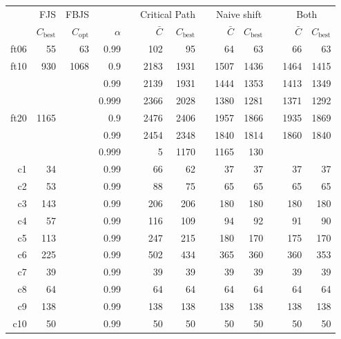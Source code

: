 \documentclass[a4paper,10pt]{article}
\begin{document}
\begin{table}[h]
\centering
\small
\begin{tabular}{@{\bfseries}rrrrrrrrrrrrr}
	\toprule
	& FJS & FBJS & && \multicolumn{2}{c}{Critical Path} &&
	\multicolumn{2}{c}{Naive shift} && \multicolumn{2}{c}{Both} \\
	\cmidrule(lr){2-2} \cmidrule(lr){3-3} \cmidrule(lr){6-7}
	\cmidrule(lr){9-10} \cmidrule(lr){12-13}
	\normalfont{name} & $C_\text{best}$ & $C_\text{opt}$ & $\alpha$ && $\bar{C}$ & $C_\text{best}$ &&
	$\bar{C}$ & $C_\text{best}$ && $\bar{C}$ & $C_\text{best}$ \\
	\midrule
	ft06 &   55 &   63 &  0.99 &&  102 &   95 &&   64 &   63 &&   66 &   63 \\
	ft10 &  930 & 1068 &   0.9 && 2183 & 1931 && 1507 & 1436 && 1464 & 1415 \\
	     &      &      &  0.99 && 2139 & 1931 && 1444 & 1353 && 1413 & 1349 \\
	     &      &      & 0.999 && 2366 & 2028 && 1380 & 1281 && 1371 & 1292 \\
	ft20 & 1165 &      &   0.9 && 2476 & 2406 && 1957 & 1866 && 1935 & 1869 \\
	     &      &      &  0.99 && 2454 & 2348 && 1840 & 1814 && 1860 & 1840 \\
	     &      &      & 0.999 && 5 & 1170 && 1165 &  130 &&   & \\[2ex]
	c1   &   34 &      &  0.99 &&   66 &   62 &&   37 &   37 &&   37 &   37 \\
	c2   &   53 &      &  0.99 &&   88 &   75 &&   65 &   65 &&   65 &   65 \\
	c3   &  143 &      &  0.99 &&  206 &  206 &&  180 &  180 &&  180 &  180 \\
	c4   &   57 &      &  0.99 &&  116 &  109 &&   94 &   92 &&   91 &   90 \\
	c5   &  113 &      &  0.99 &&  247 &  215 &&  180 &  170 &&  175 &  170 \\
	c6   &  225 &      &  0.99 &&  502 &  434 &&  365 &  360 &&  360 &  353 \\
	c7   &   39 &      &  0.99 &&   39 &   39 &&   39 &   39 &&   39 &   39 \\
	c8   &   64 &      &  0.99 &&   64 &   64 &&   64 &   64 &&   64 &   64 \\
	c9   &  138 &      &  0.99 &&  138 &  138 &&  138 &  138 &&  138 &  138 \\
	c10  &   50 &      &  0.99 &&   50 &   50 &&   50 &   50 &&   50 &   50 \\

\end{tabular}
\end{table}
\end{document}
